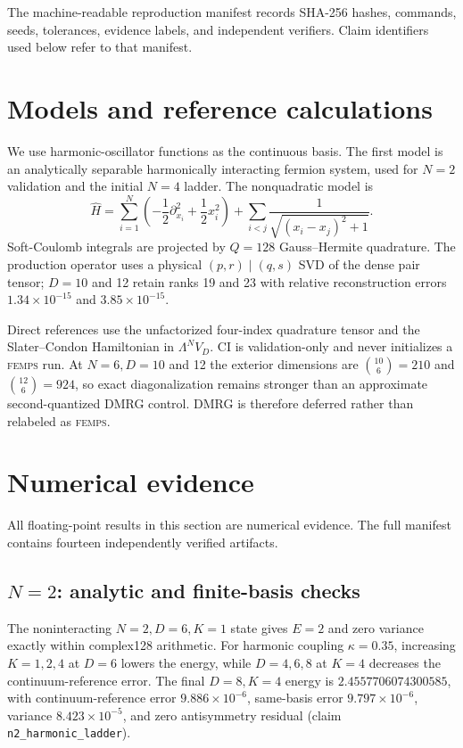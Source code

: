 \documentclass[11pt]{article}
\newcommand{\FEMPS}{\textnormal{\textsc{femps}}}
\newcommand{\claimid}[1]{\nolinkurl{#1}}
\begin{document}
The machine-readable reproduction manifest records SHA-256 hashes, commands,
seeds, tolerances, evidence labels, and independent verifiers.  Claim
identifiers used below refer to that manifest.

\section{Models and reference calculations}

We use harmonic-oscillator functions as the continuous basis.  The first model
is an analytically separable harmonically interacting fermion system, used for
$N=2$ validation and the initial $N=4$ ladder.  The nonquadratic model is
\begin{equation}
 \hat H=\sum_{i=1}^{N}\left(-\frac12\partial_{x_i}^2+\frac12x_i^2\right)
 +\sum_{i<j}\frac{1}{\sqrt{(x_i-x_j)^2+1}}.
 \label{eq:soft-coulomb}
\end{equation}
Soft-Coulomb integrals are projected by $Q=128$ Gauss--Hermite quadrature.  The
production operator uses a physical $(p,r)\mid(q,s)$ SVD of the dense pair
tensor; $D=10$ and 12 retain ranks 19 and 23 with relative reconstruction
errors $1.34\times10^{-15}$ and $3.85\times10^{-15}$.

Direct references use the unfactorized four-index quadrature tensor and the
Slater--Condon Hamiltonian in $\Lambda^N V_D$.  CI is validation-only and never
initializes a \FEMPS{} run.  At $N=6,D=10$ and 12 the exterior dimensions are
$\binom{10}{6}=210$ and $\binom{12}{6}=924$, so exact diagonalization remains stronger than an
approximate second-quantized DMRG control.  DMRG is therefore deferred rather
than relabeled as \FEMPS{}.

\section{Numerical evidence}

All floating-point results in this section are numerical evidence.  The full
manifest contains fourteen independently verified artifacts.

\subsection{\texorpdfstring{$N=2$}{N=2}: analytic and finite-basis checks}

The noninteracting $N=2,D=6,K=1$ state gives $E=2$ and zero variance exactly
within complex128 arithmetic.  For harmonic coupling $\kappa=0.35$, increasing
$K=1,2,4$ at $D=6$ lowers the energy, while $D=4,6,8$ at $K=4$ decreases the
continuum-reference error.  The final $D=8,K=4$ energy is
$2.4557706074300585$, with continuum-reference error
$9.886\times10^{-6}$, same-basis error $9.797\times10^{-6}$, variance
$8.423\times10^{-5}$, and zero antisymmetry residual
(claim \claimid{n2_harmonic_ladder}).
\end{document}
